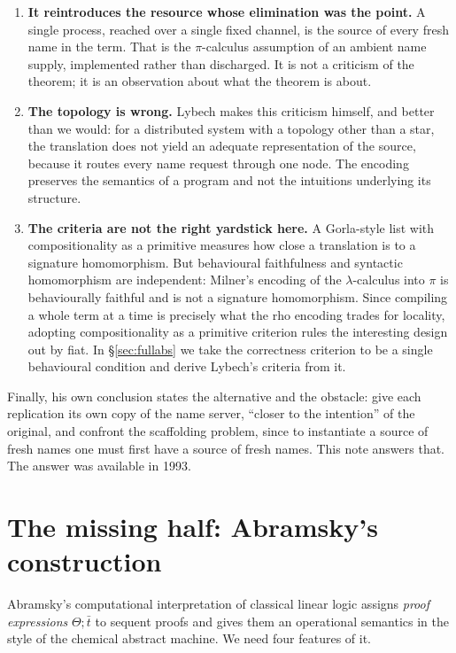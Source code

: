 \documentclass[11pt]{article}
\theoremstyle{definition}
\theoremstyle{plain}
\theoremstyle{remark}
\begin{document}
\begin{enumerate}[label=(\arabic*),leftmargin=2.2em]
\item \textbf{It reintroduces the resource whose elimination was the
point.} A single process, reached over a single fixed channel, is the
source of every fresh name in the term. That is the $\pi$-calculus
assumption of an ambient name supply, implemented rather than discharged.
It is not a criticism of the theorem; it is an observation about what the
theorem is about.
\item \textbf{The topology is wrong.} Lybech makes this criticism
himself, and better than we would: for a distributed system with a
topology other than a star, the translation does not yield an adequate
representation of the source, because it routes every name request
through one node. The encoding preserves the semantics of a program and
not the intuitions underlying its structure.
\item \textbf{The criteria are not the right yardstick here.} A
Gorla-style list with compositionality as a primitive measures how close a
translation is to a signature homomorphism. But behavioural faithfulness
and syntactic homomorphism are independent: Milner's encoding of the
$\lambda$-calculus into $\pi$ is behaviourally faithful and is not a
signature homomorphism. Since compiling a whole term at a time is
precisely what the rho encoding trades for locality, adopting
compositionality as a primitive criterion rules the interesting design
out by fiat. In \S\ref{sec:fullabs} we take the correctness criterion to
be a single behavioural condition and derive Lybech's criteria from it.
\end{enumerate}

Finally, his own conclusion states the alternative and the obstacle: give
each replication its own copy of the name server, ``closer to the
intention'' of the original, and confront the scaffolding problem, since
to instantiate a source of fresh names one must first have a source of
fresh names. This note answers that. The answer was available in 1993.

\section{The missing half: Abramsky's construction}\label{sec:abramsky}

Abramsky's computational interpretation of classical linear logic
\cite{Abramsky93} assigns \emph{proof expressions} $\Theta;\bar t$ to
sequent proofs and gives them an operational semantics in the style of
the chemical abstract machine. We need four features of it.
\end{document}
